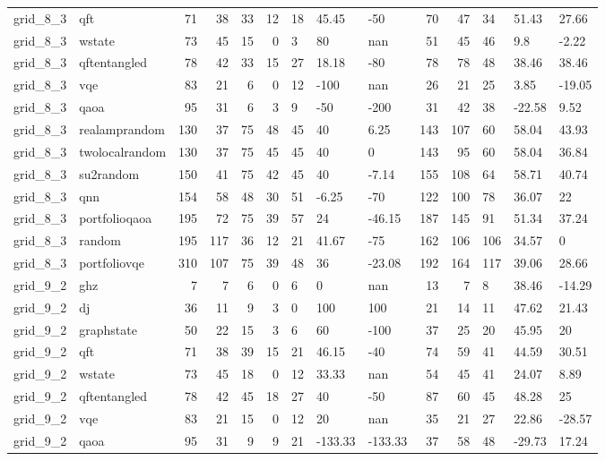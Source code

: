 \begin{longtable}{llrrrrlllrrlll}
grid\_8\_3 & qft & 71 & 38 & 33 & 12 & 18 & 45.45 & -50 & 70 & 47 & 34 & 51.43 & 27.66 \\
grid\_8\_3 & wstate & 73 & 45 & 15 & 0 & 3 & 80 & nan & 51 & 45 & 46 & 9.8 & -2.22 \\
grid\_8\_3 & qftentangled & 78 & 42 & 33 & 15 & 27 & 18.18 & -80 & 78 & 78 & 48 & 38.46 & 38.46 \\
grid\_8\_3 & vqe & 83 & 21 & 6 & 0 & 12 & -100 & nan & 26 & 21 & 25 & 3.85 & -19.05 \\
grid\_8\_3 & qaoa & 95 & 31 & 6 & 3 & 9 & -50 & -200 & 31 & 42 & 38 & -22.58 & 9.52 \\
grid\_8\_3 & realamprandom & 130 & 37 & 75 & 48 & 45 & 40 & 6.25 & 143 & 107 & 60 & 58.04 & 43.93 \\
grid\_8\_3 & twolocalrandom & 130 & 37 & 75 & 45 & 45 & 40 & 0 & 143 & 95 & 60 & 58.04 & 36.84 \\
grid\_8\_3 & su2random & 150 & 41 & 75 & 42 & 45 & 40 & -7.14 & 155 & 108 & 64 & 58.71 & 40.74 \\
grid\_8\_3 & qnn & 154 & 58 & 48 & 30 & 51 & -6.25 & -70 & 122 & 100 & 78 & 36.07 & 22 \\
grid\_8\_3 & portfolioqaoa & 195 & 72 & 75 & 39 & 57 & 24 & -46.15 & 187 & 145 & 91 & 51.34 & 37.24 \\
grid\_8\_3 & random & 195 & 117 & 36 & 12 & 21 & 41.67 & -75 & 162 & 106 & 106 & 34.57 & 0 \\
grid\_8\_3 & portfoliovqe & 310 & 107 & 75 & 39 & 48 & 36 & -23.08 & 192 & 164 & 117 & 39.06 & 28.66 \\
grid\_9\_2 & ghz & 7 & 7 & 6 & 0 & 6 & 0 & nan & 13 & 7 & 8 & 38.46 & -14.29 \\
grid\_9\_2 & dj & 36 & 11 & 9 & 3 & 0 & 100 & 100 & 21 & 14 & 11 & 47.62 & 21.43 \\
grid\_9\_2 & graphstate & 50 & 22 & 15 & 3 & 6 & 60 & -100 & 37 & 25 & 20 & 45.95 & 20 \\
grid\_9\_2 & qft & 71 & 38 & 39 & 15 & 21 & 46.15 & -40 & 74 & 59 & 41 & 44.59 & 30.51 \\
grid\_9\_2 & wstate & 73 & 45 & 18 & 0 & 12 & 33.33 & nan & 54 & 45 & 41 & 24.07 & 8.89 \\
grid\_9\_2 & qftentangled & 78 & 42 & 45 & 18 & 27 & 40 & -50 & 87 & 60 & 45 & 48.28 & 25 \\
grid\_9\_2 & vqe & 83 & 21 & 15 & 0 & 12 & 20 & nan & 35 & 21 & 27 & 22.86 & -28.57 \\
grid\_9\_2 & qaoa & 95 & 31 & 9 & 9 & 21 & -133.33 & -133.33 & 37 & 58 & 48 & -29.73 & 17.24 \\

\end{longtable}
